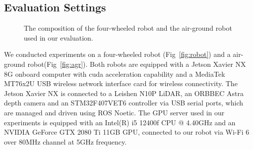 \subsection{Evaluation Settings}

\begin{figure}[!t]
    \centering
    \hfil
    \vspace{-0.3cm}
    \caption{The composition of the four-wheeled robot and the air-ground robot used in our evaluation.}
    \vspace{-0.3cm}
\end{figure}

We conducted experiments on a four-wheeled robot (Fig~\ref{fig:robot}) and a air-ground robot(Fig~\ref{fig:agr}).
Both robots are equipped with a Jetson Xavier NX~\cite{jetsonnx} 8G onboard computer with cuda acceleration capability and a MediaTek MT76x2U USB wireless network interface card for wireless connectivity.
The Jetson Xavier NX is connected to a Leishen N10P LiDAR, an ORBBEC Astra depth camera and an STM32F407VET6 controller via USB serial ports, which are managed and driven using ROS Noetic. 
The GPU server used in our experiments is equipped with an Intel(R) i5 12400f CPU @ 4.40GHz and an NVIDIA GeForce GTX 2080 Ti 11GB GPU, connected to our robot via Wi-Fi 6 over 80MHz channel at 5GHz frequency.


